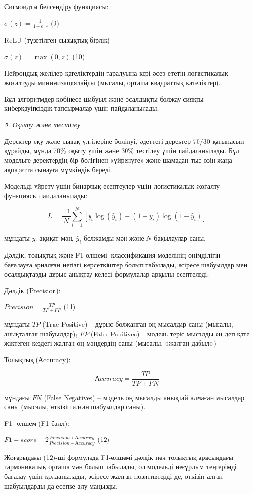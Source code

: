Сигмоидты белсендіру функциясы:

\(\sigma(z) = \frac{1}{1 + e^{- z}}\) (9)

ReLU (түзетілген сызықтық бірлік)

\(\sigma(z) = \max(0,z)\) (10)

Нейрондық желілер қателіктердің таралуына кері әсер ететін логистикалық
жоғалтуды минимизациялайды (мысалы, орташа квадраттық қателіктер).

Бұл алгоритмдер көбінесе шабуыл және осалдықты болжау сияқты
киберқауіпсіздік тапсырмалар үшін пайдаланылады.

\emph{5. Оқыту және тестілеу}

Деректер оқу және сынақ үлгілеріне бөлінуі, әдеттегі деректер 70/30
қатынасын құрайды, мұнда 70\% оқыту үшін және 30\% тестілеу үшін
пайдаланылады. Бұл модельге деректердің бір бөлігінен «үйренуге» және
шамадан тыс өзін жаңа ақпаратта сынауға мүмкіндік береді.

Модельді үйрету үшін бинарлық есептеулер үшін логистикалық жоғалту
функциясы пайдаланылады:

\[L = \frac{- 1}{N}\sum_{i = 1}^{N}\left\lbrack y_{i}\log\left( {\hat{y}}_{i} \right) + (1 - y_{i})\log(1 - {\hat{y}}_{i}) \right\rbrack\]

мұндағы \(y_{i}\) ақиқат мән, \({\hat{y}}_{i}\) болжамды мән және \(N\)
бақылаулар саны.

Дәлдік, толықтық және F1 өлшемі, классификация моделінің өнімділігін
бағалауға арналған негізгі көрсеткіштер болып табылады, әсіресе
шабуылдар мен осалдықтарды дұрыс анықтау келесі формулалар арқылы
есептеледі:

Дәлдік (Precision):

\(Precision = \frac{TP}{TP + FP}\) (11)

мұндағы \(TP\) (True Positive) -- дұрыс болжанған оң мысалдар саны
(мысалы, анықталған шабуылдар); \(FP\) (False Positives) -- модель теріс
мысалды оң деп қате жіктеген кездегі жалған оң мәндердің саны (мысалы,
«жалған дабыл»).

Толықтық (Аccuracy):

\[Аccuracy = \frac{TP}{TP + FN}\]

мұндағы \(FN\) (False Negatives) -- модель оң мысалды анықтай алмаған
мысалдар саны (мысалы, өткізіп алған шабуылдар саны).

F1- өлшем (F1-балл):

\(F1 - score = 2\frac{Precision \times Аccuracy}{Precision + Аccuracy}\)
(12)

Жоғарыдағы (12)-ші формулада F1-өлшемі дәлдік пен толықтық арасындағы
гармоникалық орташа мән болып табылады, ол модельді неғұрлым теңгерімді
бағалау үшін қолданылады, әсіресе жалған позитивтерді де, өткізіп алған
шабуылдарды да есепке алу маңызды.

